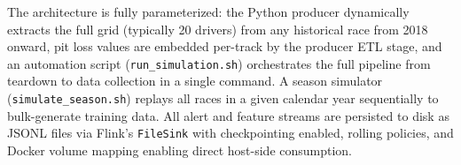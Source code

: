 \documentclass[a4paper,twocolumn]{article}
\begin{document}
The architecture is fully parameterized: the Python producer dynamically
extracts the full grid (typically 20 drivers) from any historical race
from 2018 onward, pit loss values are embedded per-track by the producer
ETL stage, and an automation script (\texttt{run\_simulation.sh})
orchestrates the full pipeline from teardown to data collection in a
single command. A season simulator (\texttt{simulate\_season.sh}) replays
all races in a given calendar year sequentially to bulk-generate training
data. All alert and feature streams are persisted to disk as JSONL files
via Flink's \texttt{FileSink} with checkpointing enabled, rolling
policies, and Docker volume mapping enabling direct host-side consumption.
\end{document}
